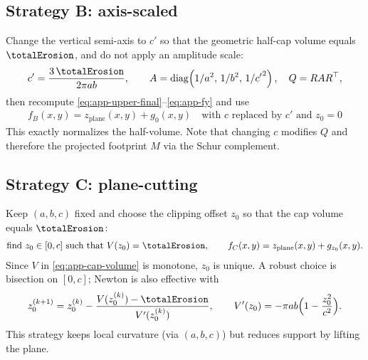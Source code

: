 \subsection*{Strategy B: axis-scaled}
Change the vertical semi-axis to $c'$ so that the geometric half-cap volume equals $\totalErosion$, and do not apply an amplitude scale:
\begin{align}
    \label{eq:app-stratB}
    c'=\frac{3\,\totalErosion}{2\pi a b},\qquad
    A=\operatorname{diag}\!\left(1/a^2,\,1/b^2,\,1/{c'}^{2}\right),\quad Q=RAR^\top,
\end{align}
then recompute \cref{eq:app-upper-final}--\cref{eq:app-fy} and use
\begin{align}
    f_B(x,y)=z_{\text{plane}}(x,y)+g_{0}(x,y)\quad\text{with $c$ replaced by $c'$ and $z_0=0$}
\end{align}
This exactly normalizes the half-volume. Note that changing $c$ modifies $Q$ and therefore the projected footprint $M$ via the Schur complement.

\subsection*{Strategy C: plane-cutting}
Keep $(a,b,c)$ fixed and choose the clipping offset $z_0$ so that the cap volume equals $\totalErosion$:
\begin{align}
    \label{eq:app-stratC}
    \text{find }z_0\in[0,c]\ \text{such that}\ V(z_0)=\totalErosion,\qquad f_C(x,y)=z_{\text{plane}}(x,y)+g_{z_0}(x,y).
\end{align}
Since $V$ in \cref{eq:app-cap-volume} is monotone, $z_0$ is unique. A robust choice is bisection on $[0,c]$; Newton is also effective with
\begin{align}
    z_0^{(k+1)}=z_0^{(k)}-\frac{V(z_0^{(k)})-\totalErosion}{V'(z_0^{(k)})},\qquad
    V'(z_0)=-\pi a b\Bigl(1-\frac{z_0^2}{c^2}\Bigr).
\end{align}
This strategy keeps local curvature (via $(a,b,c)$) but reduces support by lifting the plane.


